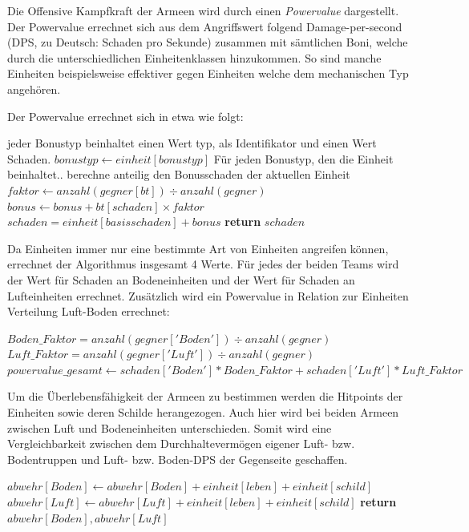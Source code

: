 Die Offensive Kampfkraft der Armeen wird durch einen \textit{Powervalue} dargestellt. Der Powervalue errechnet sich aus dem Angriffswert folgend Damage-per-second (DPS, zu Deutsch: Schaden pro Sekunde) zusammen mit sämtlichen Boni, welche durch die unterschiedlichen Einheitenklassen hinzukommen. So sind manche Einheiten beispielsweise effektiver gegen Einheiten welche dem mechanischen Typ angehören. 

Der Powervalue errechnet sich in etwa wie folgt:
\begin{algorithmic}[1]
	\State \Comment jeder Bonustyp beinhaltet einen Wert typ, als Identifikator und einen Wert Schaden.
	\State $bonustyp \leftarrow einheit[bonustyp]$
	\State \Comment Für jeden Bonustyp, den die Einheit beinhaltet..
			\State \Comment berechne anteilig den Bonusschaden der aktuellen Einheit
			\State $faktor \leftarrow anzahl(gegner[bt]) \div anzahl(gegner)$
			\State $bonus \leftarrow bonus + bt[schaden] \times faktor$
		\EndIf
	\EndFor
	\State $schaden = einheit[basisschaden] + bonus$
	\State \textbf{return} $schaden$
\EndProcedure
\end{algorithmic}

Da Einheiten immer nur eine bestimmte Art von Einheiten angreifen können, errechnet der Algorithmus insgesamt 4 Werte. Für jedes der beiden Teams wird der Wert für Schaden an Bodeneinheiten und der Wert für Schaden an Lufteinheiten errechnet. Zusätzlich wird ein Powervalue in Relation zur Einheiten Verteilung Luft-Boden errechnet:
\begin{algorithmic}[1]
\State $Boden\_Faktor = anzahl(gegner['Boden']) \div anzahl(gegner)$
\State $Luft\_Faktor = anzahl(gegner['Luft']) \div anzahl(gegner)$
\State $powervalue\_gesamt \leftarrow schaden['Boden'] * Boden\_Faktor + schaden['Luft'] * Luft\_Faktor$ 
\end{algorithmic}



Um die Überlebensfähigkeit der Armeen zu bestimmen werden die Hitpoints der Einheiten sowie deren Schilde herangezogen. Auch hier wird bei beiden Armeen zwischen Luft und Bodeneinheiten unterschieden. Somit wird eine Vergleichbarkeit zwischen dem Durchhaltevermögen eigener Luft- bzw. Bodentruppen und Luft- bzw. Boden-DPS der Gegenseite geschaffen.

\begin{algorithmic}[1]
			\State $abwehr[Boden] \leftarrow abwehr[Boden] + einheit[leben] + einheit[schild]$
		\EndIf
			\State $abwehr[Luft] \leftarrow abwehr[Luft] + einheit[leben] + einheit[schild]$
		\EndIf
	\EndFor 
	\State \textbf{return} $abwehr[Boden], abwehr[Luft]$
\EndProcedure
\end{algorithmic}

